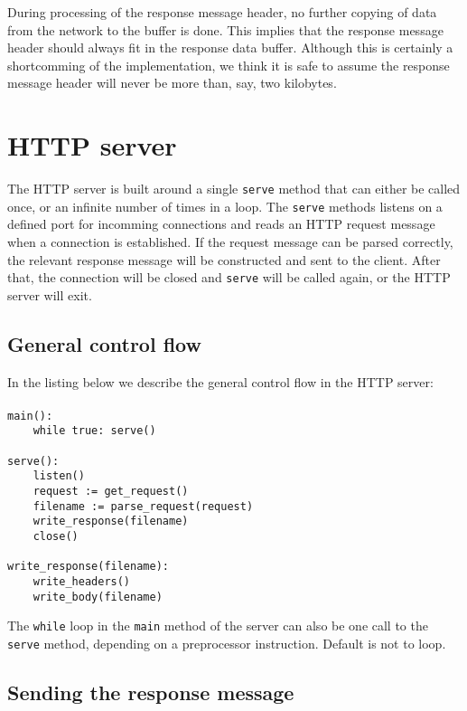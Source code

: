 \documentclass[11pt]{article}
\begin{document}
During processing of the response message header, no further copying of data
from the network to the buffer is done. This implies that the response message
header should always fit in the response data buffer. Although this is
certainly a shortcomming of the implementation, we think it is safe to assume
the response message header will never be more than, say, two kilobytes.


\section{HTTP server}

The HTTP server is built around a single \lstinline|serve| method that can either
be called once, or an infinite number of times in a loop. The \lstinline|serve|
methods listens on a defined port for incomming connections and reads an HTTP
request message when a connection is established. If the request message can
be parsed correctly, the relevant response message will be constructed and
sent to the client. After that, the connection will be closed and \lstinline|serve|
will be called again, or the HTTP server will exit.


\subsection{General control flow}

In the listing below we describe the general control flow in the HTTP server:

\paragraph{}

\begin{lstlisting}[title=HTTP client control flow]
main():
    while true: serve()

serve():
    listen()
    request := get_request()
    filename := parse_request(request)
    write_response(filename)
    close()

write_response(filename):
    write_headers()
    write_body(filename)
\end{lstlisting}

The \lstinline|while| loop in the \lstinline|main| method of the server can
also be one call to the \lstinline|serve| method, depending on a preprocessor
instruction. Default is not to loop.


\subsection{Sending the response message}
\end{document}
